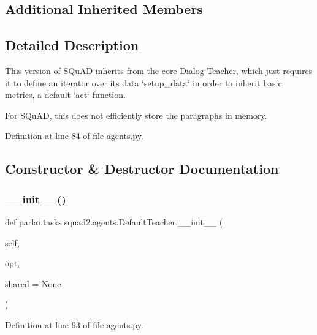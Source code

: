 \subsection*{Additional Inherited Members}


\subsection{Detailed Description}
\begin{DoxyVerb}This version of SQuAD inherits from the core Dialog Teacher, which just requires it
to define an iterator over its data `setup_data` in order to inherit basic metrics,
a default `act` function.

For SQuAD, this does not efficiently store the paragraphs in memory.
\end{DoxyVerb}
 

Definition at line 84 of file agents.\+py.



\subsection{Constructor \& Destructor Documentation}
\mbox{\label{classparlai_1_1tasks_1_1squad2_1_1agents_1_1DefaultTeacher_aa97ab84de16c6d73501fef0c11bb1608}} 
\subsubsection{\texorpdfstring{\+\_\+\+\_\+init\+\_\+\+\_\+()}{\_\_init\_\_()}}
{\footnotesize\ttfamily def parlai.\+tasks.\+squad2.\+agents.\+Default\+Teacher.\+\_\+\+\_\+init\+\_\+\+\_\+ (\begin{DoxyParamCaption}\item[{}]{self,  }\item[{}]{opt,  }\item[{}]{shared = {\ttfamily None} }\end{DoxyParamCaption})}



Definition at line 93 of file agents.\+py.



